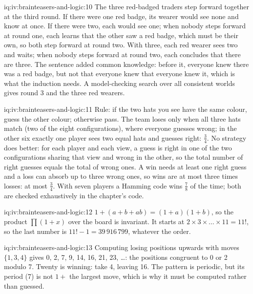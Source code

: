 \begin{solution}{iq:iv:brainteasers-and-logic:10}
The three red-badged traders step forward together at the third round. If there were one red badge, its wearer
would see none and know at once. If there were two, each would see one; when nobody steps forward at round one,
each learns that the other saw a red badge, which must be their own, so both step forward at round two. With
three, each red wearer sees two and waits; when nobody steps forward at round two, each concludes that there are
three. The sentence added common knowledge: before it, everyone knew there was a red badge, but not that everyone
knew that everyone knew it, which is what the induction needs. A model-checking search over all consistent
worlds gives round 3 and the three red wearers.
\end{solution}

\begin{solution}{iq:iv:brainteasers-and-logic:11}
Rule: if the two hats you see have the same colour, guess the other colour; otherwise pass. The team loses only
when all three hats match (two of the eight configurations), where everyone guesses wrong; in the other six exactly
one player sees two equal hats and guesses right: $\tfrac34$. No strategy does better: for each player and each view,
a guess is right in one of the two configurations sharing that view and wrong in the other, so the total number of
right guesses equals the total of wrong ones. A win needs at least one right guess and a loss can absorb up to three
wrong ones, so wins are at most three times losses: at most $\tfrac34$. With seven players a Hamming code wins
$\tfrac78$ of the time; both are checked exhaustively in the chapter's code.
\end{solution}

\begin{solution}{iq:iv:brainteasers-and-logic:12}
$1 + (a + b + ab) = (1 + a)(1 + b)$, so the product $\prod(1 + x)$ over the board is invariant. It starts at
$2 \times 3 \times \dots \times 11 = 11!$, so the last number is $11! - 1 = 39\,916\,799$, whatever the order.
\end{solution}

\begin{solution}{iq:iv:brainteasers-and-logic:13}
Computing losing positions upwards with moves $\{1, 3, 4\}$ gives 0, 2, 7, 9, 14, 16, 21, 23, \dots: the
positions congruent to 0 or 2 modulo 7. Twenty is winning: take 4, leaving 16. The pattern is periodic, but its
period (7) is not $1 + $ the largest move, which is why it must be computed rather than guessed.
\end{solution}

